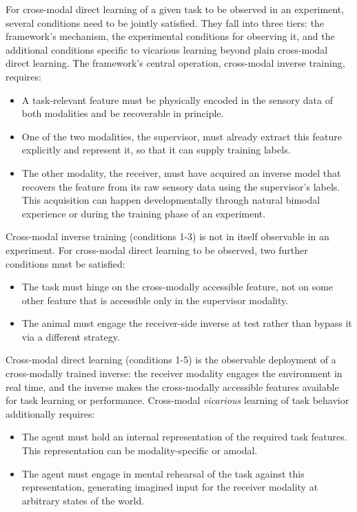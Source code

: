 \documentclass[11pt]{article}
\begin{document}
For cross-modal direct learning of a given task to be observed in an experiment, several conditions need to be jointly satisfied. They fall into three tiers: the framework's mechanism, the experimental conditions for observing it, and the additional conditions specific to vicarious learning beyond plain cross-modal direct learning. The framework's central operation, cross-modal inverse training, requires:
%
\begin{itemize}
\item[1] A task-relevant feature must be physically encoded in the sensory data of both modalities and be recoverable in principle.
\item[2] One of the two modalities, the supervisor, must already extract this feature explicitly and represent it, so that it can supply training labels.
\item[3] The other modality, the receiver, must have acquired an inverse model that recovers the feature from its raw sensory data using the supervisor's labels. This acquisition can happen developmentally through natural bimodal experience or during the training phase of an experiment.
\end{itemize}


Cross-modal inverse training (conditions 1-3) is not in itself observable in an experiment. For cross-modal direct learning to be observed, two further conditions must be satisfied:
%
\begin{itemize}
\item[4] The task must hinge on the cross-modally accessible feature, not on some other feature that is accessible only in the supervisor modality.
\item[5] The animal must engage the receiver-side inverse at test rather than bypass it via a different strategy.
\end{itemize}


Cross-modal direct learning (conditions 1-5) is the observable deployment of a cross-modally trained inverse: the receiver modality engages the environment in real time, and the inverse makes the cross-modally accessible features available for task learning or performance. Cross-modal \emph{vicarious} learning of task behavior additionally requires:
%
\begin{itemize}
\item[6] The agent must hold an internal representation of the required task features. This representation can be modality-specific or amodal.
\item[7] The agent must engage in mental rehearsal of the task against this representation, generating imagined input for the receiver modality at arbitrary states of the world.
\end{itemize}
\end{document}
